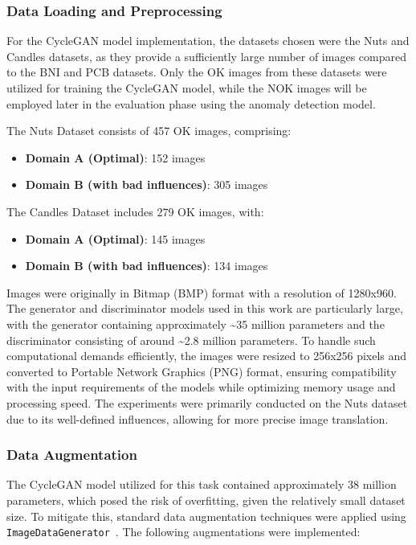 \documentclass[12pt,DIV14,BCOR12mm,a4paper,footinclude=false,headinclude,parskip=half-,twoside,openright,cleardoublepage=empty,toc=index,bibliography=totoc,listof=totoc]{scrreprt}
\numberwithin{equation}{chapter}
\begin{document}
\subsubsection{Data Loading and Preprocessing}
For the CycleGAN model implementation, the datasets chosen were the Nuts and Candles datasets, as they provide a sufficiently large number of images compared to the BNI and PCB datasets. Only the OK images from these datasets were utilized for training the CycleGAN model, while the NOK images will be employed later in the evaluation phase using the anomaly detection model.

The Nuts Dataset consists of 457 OK images, comprising:
\begin{itemize}
    \item \textbf{Domain A (Optimal)}: 152 images
    \item \textbf{Domain B (with bad influences)}: 305 images
\end{itemize}

The Candles Dataset includes 279 OK images, with:
\begin{itemize}
    \item \textbf{Domain A (Optimal)}: 145 images
    \item \textbf{Domain B (with bad influences)}: 134 images
\end{itemize}

Images were originally in Bitmap (BMP) format with a resolution of 1280x960. The generator and discriminator models used in this work are particularly large, with the generator containing approximately \textasciitilde 35 million parameters and the discriminator consisting of around \textasciitilde 2.8 million parameters. To handle such computational demands efficiently, the images were resized to 256x256 pixels and converted to Portable Network Graphics (PNG) format, ensuring compatibility with the input requirements of the models while optimizing memory usage and processing speed. The experiments were primarily conducted on the Nuts dataset due to its well-defined influences, allowing for more precise image translation.
\subsubsection{Data Augmentation}
The CycleGAN model utilized for this task contained approximately 38 million parameters, which posed the risk of overfitting, given the relatively small dataset size. To mitigate this, standard data augmentation techniques were applied using \texttt{ImageDataGenerator}~\cite{tensorflow_imagedatagenerator}. The following augmentations were implemented:
\end{document}
